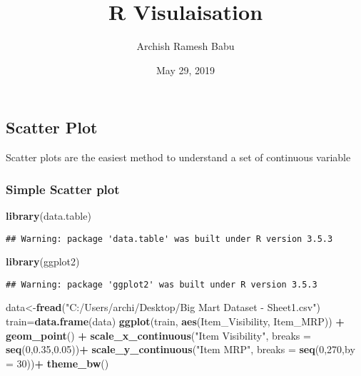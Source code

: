 \documentclass[]{article}
\title{R Visulaisation}
\author{Archish Ramesh Babu}
\date{May 29, 2019}
\newenvironment{Shaded}{\begin{snugshade}}{\end{snugshade}}
\newcommand{\KeywordTok}[1]{\textcolor[rgb]{0.13,0.29,0.53}{\textbf{#1}}}
\newcommand{\DataTypeTok}[1]{\textcolor[rgb]{0.13,0.29,0.53}{#1}}
\newcommand{\DecValTok}[1]{\textcolor[rgb]{0.00,0.00,0.81}{#1}}
\newcommand{\FloatTok}[1]{\textcolor[rgb]{0.00,0.00,0.81}{#1}}
\newcommand{\StringTok}[1]{\textcolor[rgb]{0.31,0.60,0.02}{#1}}
\newcommand{\OperatorTok}[1]{\textcolor[rgb]{0.81,0.36,0.00}{\textbf{#1}}}
\newcommand{\NormalTok}[1]{#1}
\begin{document}
\maketitle

\subsection{Scatter Plot}\label{scatter-plot}

Scatter plots are the easiest method to understand a set of continuous
variable

\subsubsection{Simple Scatter plot}\label{simple-scatter-plot}

\begin{Shaded}
\begin{Highlighting}[]
\KeywordTok{library}\NormalTok{(data.table)}
\end{Highlighting}
\end{Shaded}

\begin{verbatim}
## Warning: package 'data.table' was built under R version 3.5.3
\end{verbatim}

\begin{Shaded}
\begin{Highlighting}[]
\KeywordTok{library}\NormalTok{(ggplot2)}
\end{Highlighting}
\end{Shaded}

\begin{verbatim}
## Warning: package 'ggplot2' was built under R version 3.5.3
\end{verbatim}

\begin{Shaded}
\begin{Highlighting}[]
\NormalTok{data<-}\KeywordTok{fread}\NormalTok{(}\StringTok{"C:/Users/archi/Desktop/Big Mart Dataset - Sheet1.csv"}\NormalTok{)}
\NormalTok{train=}\KeywordTok{data.frame}\NormalTok{(data)}
\KeywordTok{ggplot}\NormalTok{(train, }\KeywordTok{aes}\NormalTok{(Item_Visibility, Item_MRP)) }\OperatorTok{+}\StringTok{ }\KeywordTok{geom_point}\NormalTok{() }\OperatorTok{+}\StringTok{ }\KeywordTok{scale_x_continuous}\NormalTok{(}\StringTok{"Item Visibility"}\NormalTok{, }\DataTypeTok{breaks =} \KeywordTok{seq}\NormalTok{(}\DecValTok{0}\NormalTok{,}\FloatTok{0.35}\NormalTok{,}\FloatTok{0.05}\NormalTok{))}\OperatorTok{+}\StringTok{ }\KeywordTok{scale_y_continuous}\NormalTok{(}\StringTok{"Item MRP"}\NormalTok{, }\DataTypeTok{breaks =} \KeywordTok{seq}\NormalTok{(}\DecValTok{0}\NormalTok{,}\DecValTok{270}\NormalTok{,}\DataTypeTok{by =} \DecValTok{30}\NormalTok{))}\OperatorTok{+}\StringTok{ }\KeywordTok{theme_bw}\NormalTok{() }
\end{Highlighting}
\end{Shaded}
\end{document}
